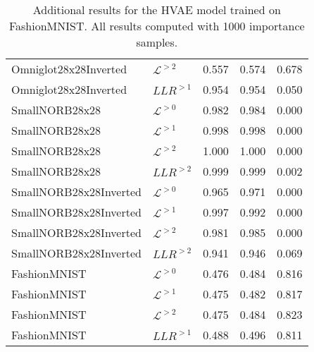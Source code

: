 {\begin{table}[t]
\begin{tabular}{llrrr}
Omniglot28x28Inverted    &  $\mathcal{L}^{>2}$    &  0.557  &  0.574  &  0.678 \\
Omniglot28x28Inverted    &  $LLR^{>1}$            &  0.954  &  0.954  &  0.050 \\
\midrule
SmallNORB28x28           &  $\mathcal{L}^{>0}$    &  0.982  &  0.984  &  0.000 \\
SmallNORB28x28           &  $\mathcal{L}^{>1}$    &  0.998  &  0.998  &  0.000 \\
SmallNORB28x28           &  $\mathcal{L}^{>2}$    &  1.000  &  1.000  &  0.000 \\
SmallNORB28x28           &  $LLR^{>2}$            &  0.999  &  0.999  &  0.002 \\
\midrule
SmallNORB28x28Inverted   &  $\mathcal{L}^{>0}$    &  0.965  &  0.971  &  0.000 \\
SmallNORB28x28Inverted   &  $\mathcal{L}^{>1}$    &  0.997  &  0.992  &  0.000 \\
SmallNORB28x28Inverted   &  $\mathcal{L}^{>2}$    &  0.981  &  0.985  &  0.000 \\
SmallNORB28x28Inverted   &  $LLR^{>2}$            &  0.941  &  0.946  &  0.069 \\
\midrule
FashionMNIST             &  $\mathcal{L}^{>0}$    &  0.476  &  0.484  &  0.816 \\
FashionMNIST             &  $\mathcal{L}^{>1}$    &  0.475  &  0.482  &  0.817 \\
FashionMNIST             &  $\mathcal{L}^{>2}$    &  0.475  &  0.484  &  0.823 \\
FashionMNIST             &  $LLR^{>1}$            &  0.488  &  0.496  &  0.811 \\
         \bottomrule
    \end{tabular}
    \caption[Additional results for the HVAE model trained on FashionMNIST]{Additional results for the HVAE model trained on FashionMNIST. All results computed with 1000 importance samples.}
    \label{tab_hierarchical:additional-results-fashionmnist}
\end{table}

}
